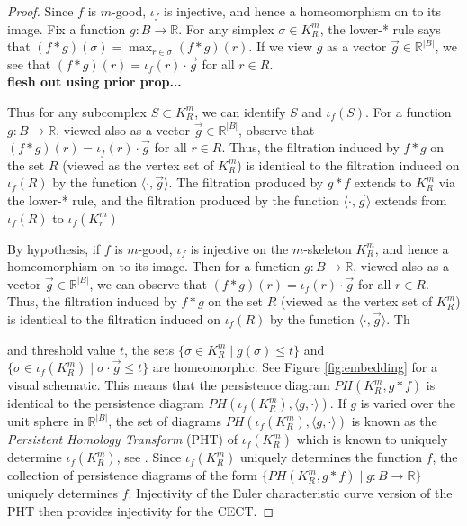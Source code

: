 \documentclass[conference]{IEEEtran}
\theoremstyle{definition}
\numberwithin{figure}{section}
\begin{document}
\begin{proof}
Since $f$ is $m$-good, $\iota_{f}$ is injective, and hence a homeomorphism on to its image. Fix a function $g: B \to \mathbb{R}$. For any simplex $\sigma \in K_{R}^m$, the lower-* rule says that $(f \ast g)(\sigma) = \max_{r \in \sigma} (f \ast g)(r)$. If we view $g$ as a vector $\vec{g} \in \mathbb{R}^{|B|}$, we see that $(f \ast g)(r) = \iota_{f}(r) \cdot \vec{g}$ for all $r \in R$.\\

{\bf flesh out using prior prop...}

Thus for any subcomplex $S \subset K_{R}^m$, we can identify $S$ and $\iota_{f}(S)$. For a function $g: B \to \mathbb{R}$, viewed also as a vector $\vec{g} \in \mathbb{R}^{|B|}$, observe that $(f \ast g)(r) = \iota_{f}(r) \cdot \vec{g}$ for all $r \in R$. Thus, the filtration induced by $f \ast g$ on the set $R$ (viewed as the vertex set of $K_{R}^m$) is identical to the filtration induced on $\iota_{f}(R)$ by the function $\langle \cdot, \vec{g} \rangle$. The filtration produced by $g \ast f$ extends to $K_{R}^m$ via the lower-* rule, and the filtration produced by the function $\langle \cdot, \vec{g} \rangle$ extends from $\iota_{f}(R)$ to $\iota_{f}(K_{r}^m)$
	
By hypothesis, if $f$ is $m$-good, $\iota_{f}$ is injective on the $m$-skeleton $K_{R}^m$, and hence a homeomorphism on to its image. Then for a function $g: B \to \mathbb{R}$, viewed also as a vector $\vec{g} \in \mathbb{R}^{|B|}$, we can observe that $(f \ast g)(r) = \iota_{f}(r) \cdot \vec{g}$ for all $r \in R$. Thus, the filtration induced by $f \ast g$ on the set $R$ (viewed as the vertex set of $K_{R}^m$) is identical to the filtration induced on $\iota_{f}(R)$ by the function $\langle \cdot, \vec{g} \rangle$. Th

and threshold value $t$, the sets $\{\sigma \in K_{R}^{m} \mid g(\sigma) \leq t\}$ and $\{\sigma \in \iota_{f}(K_{R}^m) \mid \sigma \cdot \vec{g} \leq t \}$ are homeomorphic. See Figure \ref{fig:embedding} for a visual schematic. This means that the persistence diagram $PH(K_{R}^m,g \ast f)$ is identical to the persistence diagram $PH(\iota_{f}(K_{R}^m),\langle g, \cdot \rangle)$. If $g$ is varied over the unit sphere in $\mathbb{R}^{|B|}$, the set of diagrams $PH(\iota_{f}(K_{R}^m),\langle g, \cdot \rangle)$ is known as the \emph{Persistent Homology Transform} (PHT) of $\iota_{f}(K_{R}^m)$ which is known to uniquely determine $\iota_{f}(K_{R}^m)$, see \cite{turner2014persistent,ghrist2018persistent,curry2018many}. Since $\iota_{f}(K_{R}^m)$ uniquely determines the function $f$, the collection of persistence diagrams of the form $\{PH(K_{R}^m, g \ast f) \mid g : B \to \mathbb{R}\}$ uniquely determines $f$. Injectivity of the Euler characteristic curve version of the PHT then provides injectivity for the CECT.
\end{proof}
\end{document}
